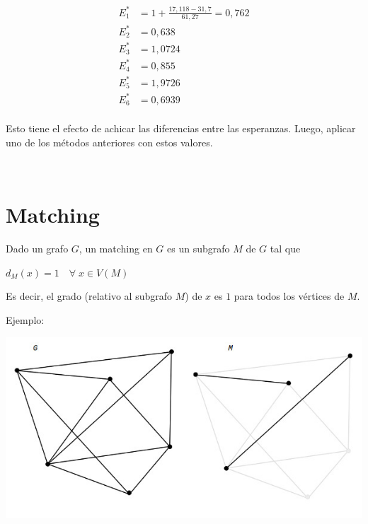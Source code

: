 \documentclass[10pt,a4paper]{article}
\begin{document}
\begin{center}
\begin{align*} E^*_1 &= 1 +\frac{ 17, 118 - 31,7}{61,27} = 0,762\\ E^*_2 &= 0,638\\ E^*_3 &= 1,0724\\ E^*_4 &= 0,855\\ E^*_5 &= 1,9726\\ E^*_6 &= 0,6939\\ \end{align*}
\end{center}

Esto tiene el efecto de achicar las diferencias entre las esperanzas. Luego, aplicar uno de los métodos anteriores con estos valores.

 

\section*{Matching}

Dado un grafo $G$, un matching en $G$ es un subgrafo $M$ de $G$ tal que

\begin{center}
$d_M(x) = 1\quad \forall\;x \in V(M)$
\end{center}

Es decir, el grado (relativo al subgrafo $M$) de $x$ es $1$ para todos los vértices de $M$.

Ejemplo:

\begin{center}

    \begin{adjustbox}{max size={\textwidth}{\textheight}}
        \includegraphics{definitions/matching_1.jpg}
        \end{adjustbox}
    
\end{center}
\end{document}
